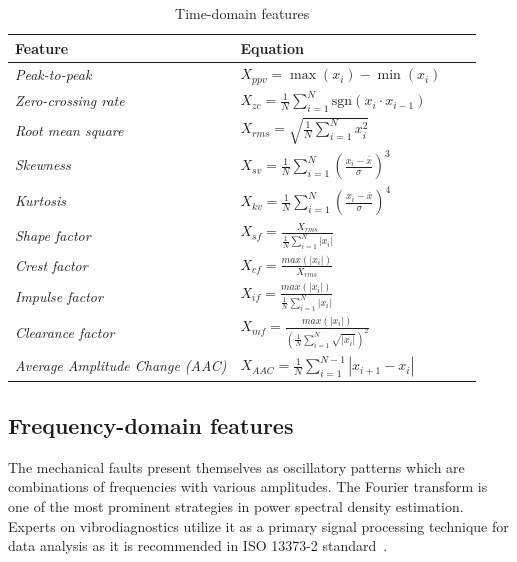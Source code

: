 \begin{table}[h]
\centering
\renewcommand{\arraystretch}{2}
\begin{tabular}{|l|l|l|l|}
\hline
\textbf{Feature}            & \textbf{Equation}                                                                    \\ \hline
\textit{Peak-to-peak}       & $ X_{ppv} = \max(x_i) - \min(x_i) $
\\ \hline
\textit{Zero-crossing rate} & $X_{zc} = \frac{1}{N}\sum_{i = 1}^{N}{\mathrm{sgn}(x_i \cdot x_{i-1})} $
\\ \hline
\textit{Root mean square}   & $ X_{rms} = \sqrt{\frac{1}{N}\sum_{i = 1}^{N}{x_i^2}} $
\\ \hline
\textit{Skewness}           & $ X_{sv} = \frac{1}{N}\sum_{i = 1}^{N}{\left(\frac{x_i - \bar{x}}{\sigma}\right)^3}$
\\ \hline
\textit{Kurtosis}           & $ X_{kv} = \frac{1}{N}\sum_{i = 1}^{N}{\left(\frac{x_i - \bar{x}}{\sigma}\right)^4}$
\\ \hline
\textit{Shape factor}   & $ X_{sf} = \frac{X_{rms}}{\frac{1}{N} \sum_{i=1}^{N}{|x_i|}}$
\\ \hline
\textit{Crest factor}   & $ X_{cf} = \frac{max(|x_i|)}{X_{rms}} $                           \\ \hline
\textit{Impulse factor} & $ X_{if} = \frac{max(|x_i|)}{\frac{1}{N} \sum_{i=1}^{N}{|x_i|}} $
\\ \hline
\textit{Clearance factor}  & $ X_{mf} = \frac{max(|x_i|)}{\left( \frac{1}{N} \sum_{i=1}^{N}{\sqrt{|x_i|}} \right)^2} $
\\ \hline
\textit{Average Amplitude Change (AAC)}        & $ X_{AAC} = \frac{1}{N}\sum_{i = 1}^{N - 1}{|x_{i + 1} - x_i|} $                             \\ \hline
\end{tabular}
\caption{Time-domain features}
\label{tab:td-features}
\end{table}


\subsection{Frequency-domain features}
The mechanical faults present themselves as oscillatory patterns which are combinations of frequencies with various amplitudes. The Fourier transform is one of the most prominent strategies in power spectral density estimation. Experts on vibrodiagnostics utilize it as a primary signal processing technique for data analysis as it is recommended in ISO 13373-2 standard~\cite{noauthor_iso_2016_2}.

